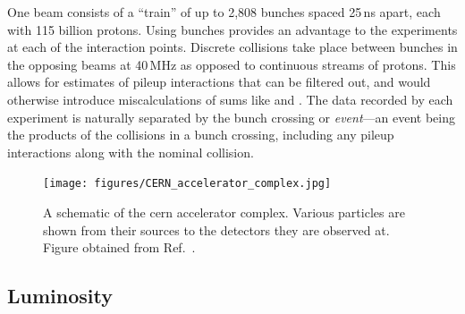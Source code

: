 One beam consists of a ``train'' of up to 2,808 bunches spaced 25\,ns apart, each with 115 billion protons. Using bunches provides an advantage to the experiments at each of the interaction points. Discrete collisions take place between bunches in the opposing beams at 40\,MHz as opposed to continuous streams of protons. This allows for estimates of \gls{pileup} interactions that can be filtered out, and would otherwise introduce miscalculations of sums like \ptmiss and \HT. The data recorded by each experiment is naturally separated by the bunch crossing or \emph{event}---an event being the products of the collisions in a bunch crossing, including any \gls{pileup} interactions along with the nominal collision.

\begin{figure}[htbp]
    \centering
    \texttt{[image: figures/CERN\_accelerator\_complex.jpg]}
    \caption[A schematic of the \acrshort{cern} accelerator complex]{A schematic of the \acrshort{cern} accelerator complex. Various particles are shown from their sources to the detectors they are observed at. Figure obtained from Ref.~.}
    \label{fig:cern_accelerator_complex}
\end{figure}





\subsection{Luminosity}
\label{subsec:luminosity}

